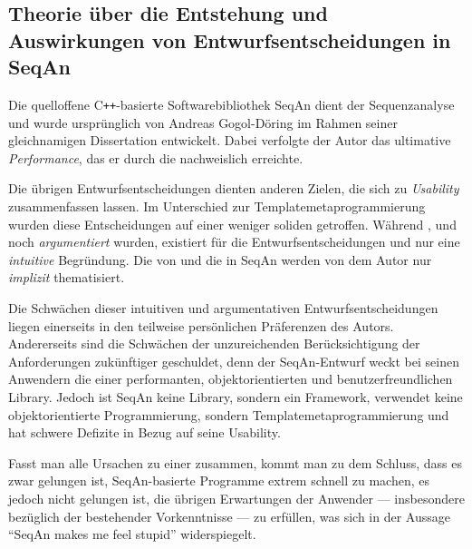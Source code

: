 \subsection{Theorie über die Entstehung und Auswirkungen von Entwurfsentscheidungen in SeqAn}

Die quelloffene C\texttt{++}-basierte Softwarebibliothek SeqAn dient der Sequenzanalyse und wurde ursprünglich von Andreas Gogol-Döring im Rahmen seiner gleichnamigen Dissertation \citep{GogolDoring:2009vz} entwickelt. Dabei verfolgte der Autor das ultimative  \textit{Performance}, das er durch die   nachweislich erreichte.

Die übrigen Entwurfsentscheidungen dienten anderen Zielen, die sich zu \textit{Usability} zusammenfassen lassen. Im Unterschied zur Templatemetaprogrammierung wurden diese Entscheidungen auf einer weniger soliden  getroffen. Während ,  und  noch \textit{argumentiert} wurden, existiert für die Entwurfsentscheidungen  und  nur eine \textit{intuitive} Begründung. Die  von und die  in SeqAn werden von dem Autor nur \textit{implizit} thematisiert.

Die Schwächen dieser intuitiven und argumentativen Entwurfsentscheidungen liegen einerseits in den teilweise persönlichen Präferenzen des Autors. Andererseits sind die Schwächen der unzureichenden Berücksichtigung der Anforderungen zukünftiger  geschuldet, denn der SeqAn-Entwurf weckt bei seinen Anwendern die  einer performanten, objektorientierten und benutzerfreundlichen Library. Jedoch ist SeqAn keine Library, sondern ein Framework, verwendet keine objektorientierte Programmierung, sondern Templatemetaprogrammierung und hat schwere Defizite in Bezug auf seine Usability.

Fasst man alle Ursachen zu einer zusammen, kommt man zu dem Schluss, dass es zwar gelungen ist, SeqAn-basierte Programme extrem schnell zu machen, es jedoch nicht gelungen ist, die übrigen Erwartungen der Anwender --- insbesondere bezüglich der  bestehender  Vorkenntnisse --- zu erfüllen, was sich in der Aussage ``SeqAn makes me feel stupid'' widerspiegelt.

